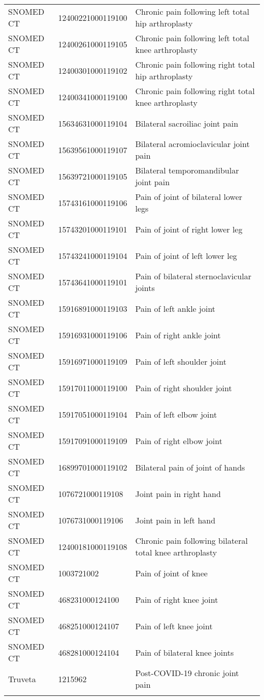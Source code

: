 \begin{longtable}{p{}p{}p{}}
  SNOMED CT & 12400221000119100 & Chronic pain following left total hip arthroplasty \\ 
  SNOMED CT & 12400261000119105 & Chronic pain following left total knee arthroplasty \\ 
  SNOMED CT & 12400301000119102 & Chronic pain following right total hip arthroplasty \\ 
  SNOMED CT & 12400341000119100 & Chronic pain following right total knee arthroplasty \\ 
  SNOMED CT & 15634631000119104 & Bilateral sacroiliac joint pain \\ 
  SNOMED CT & 15639561000119107 & Bilateral acromioclavicular joint pain \\ 
  SNOMED CT & 15639721000119105 & Bilateral temporomandibular joint pain \\ 
  SNOMED CT & 15743161000119106 & Pain of joint of bilateral lower legs \\ 
  SNOMED CT & 15743201000119101 & Pain of joint of right lower leg \\ 
  SNOMED CT & 15743241000119104 & Pain of joint of left lower leg \\ 
  SNOMED CT & 15743641000119101 & Pain of bilateral sternoclavicular joints \\ 
  SNOMED CT & 15916891000119103 & Pain of left ankle joint \\ 
  SNOMED CT & 15916931000119106 & Pain of right ankle joint \\ 
  SNOMED CT & 15916971000119109 & Pain of left shoulder joint \\ 
  SNOMED CT & 15917011000119100 & Pain of right shoulder joint \\ 
  SNOMED CT & 15917051000119104 & Pain of left elbow joint \\ 
  SNOMED CT & 15917091000119109 & Pain of right elbow joint \\ 
  SNOMED CT & 16899701000119102 & Bilateral pain of joint of hands \\ 
  SNOMED CT & 1076721000119108 & Joint pain in right hand \\ 
  SNOMED CT & 1076731000119106 & Joint pain in left hand \\ 
  SNOMED CT & 12400181000119108 & Chronic pain following bilateral total knee arthroplasty \\ 
  SNOMED CT & 1003721002 & Pain of joint of knee \\ 
  SNOMED CT & 468231000124100 & Pain of right knee joint \\ 
  SNOMED CT & 468251000124107 & Pain of left knee joint \\ 
  SNOMED CT & 468281000124104 & Pain of bilateral knee joints \\ 
  Truveta & 1215962 & Post-COVID-19 chronic joint pain \\ 
  \hline
\label{tab:codes_arthralgia}
\end{longtable}

